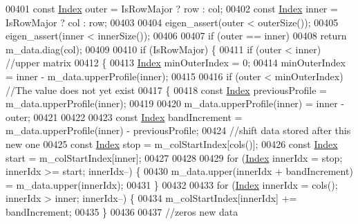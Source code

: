 \begin{DoxyCode}
00401         \textcolor{keyword}{const} \hyperlink{group___core___module_a554f30542cc2316add4b1ea0a492ff02}{Index} outer = IsRowMajor ? row : col;
00402         \textcolor{keyword}{const} \hyperlink{group___core___module_a554f30542cc2316add4b1ea0a492ff02}{Index} inner = IsRowMajor ? col : row;
00403 
00404         eigen\_assert(outer < outerSize());
00405         eigen\_assert(inner < innerSize());
00406 
00407         \textcolor{keywordflow}{if} (outer == inner)
00408             \textcolor{keywordflow}{return} m\_data.diag(col);
00409 
00410         \textcolor{keywordflow}{if} (IsRowMajor) \{
00411             \textcolor{keywordflow}{if} (outer < inner) \textcolor{comment}{//upper matrix}
00412             \{
00413                 \hyperlink{group___core___module_a554f30542cc2316add4b1ea0a492ff02}{Index} minOuterIndex = 0;
00414                 minOuterIndex = inner - m\_data.upperProfile(inner);
00415 
00416                 \textcolor{keywordflow}{if} (outer < minOuterIndex) \textcolor{comment}{//The value does not yet exist}
00417                 \{
00418                     \textcolor{keyword}{const} \hyperlink{group___core___module_a554f30542cc2316add4b1ea0a492ff02}{Index} previousProfile = m\_data.upperProfile(inner);
00419 
00420                     m\_data.upperProfile(inner) = inner - outer;
00421 
00422 
00423                     \textcolor{keyword}{const} \hyperlink{group___core___module_a554f30542cc2316add4b1ea0a492ff02}{Index} bandIncrement = m\_data.upperProfile(inner) - previousProfile;
00424                     \textcolor{comment}{//shift data stored after this new one}
00425                     \textcolor{keyword}{const} \hyperlink{group___core___module_a554f30542cc2316add4b1ea0a492ff02}{Index} stop = m\_colStartIndex[cols()];
00426                     \textcolor{keyword}{const} \hyperlink{group___core___module_a554f30542cc2316add4b1ea0a492ff02}{Index} start = m\_colStartIndex[inner];
00427 
00428 
00429                     \textcolor{keywordflow}{for} (\hyperlink{group___core___module_a554f30542cc2316add4b1ea0a492ff02}{Index} innerIdx = stop; innerIdx >= start; innerIdx--) \{
00430                         m\_data.upper(innerIdx + bandIncrement) = m\_data.upper(innerIdx);
00431                     \}
00432 
00433                     \textcolor{keywordflow}{for} (\hyperlink{group___core___module_a554f30542cc2316add4b1ea0a492ff02}{Index} innerIdx = cols(); innerIdx > inner; innerIdx--) \{
00434                         m\_colStartIndex[innerIdx] += bandIncrement;
00435                     \}
00436 
00437                     \textcolor{comment}{//zeros new data}

\end{DoxyCode}
